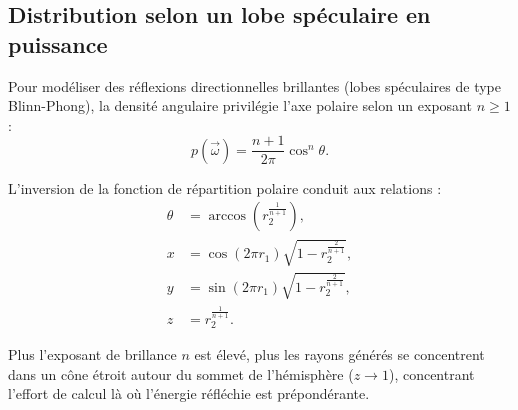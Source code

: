\subsection{Distribution selon un lobe spéculaire en puissance}

Pour modéliser des réflexions directionnelles brillantes (lobes spéculaires de type Blinn-Phong), la densité angulaire privilégie l'axe polaire selon un exposant $n \geqslant 1$ :
\begin{equation}
    p(\vec{\omega}) = \frac{n + 1}{2\pi} \cos^n\theta.
\end{equation}

\begin{proposition}
    L'inversion de la fonction de répartition polaire conduit aux relations :
    \begin{align}
        \theta &= \arccos\left( r_2^{\frac{1}{n+1}} \right), \\
        x &= \cos(2\pi r_1) \sqrt{1 - r_2^{\frac{2}{n+1}}}, \\
        y &= \sin(2\pi r_1) \sqrt{1 - r_2^{\frac{2}{n+1}}}, \\
        z &= r_2^{\frac{1}{n+1}}.
    \end{align}
\end{proposition}
Plus l'exposant de brillance $n$ est élevé, plus les rayons générés se concentrent dans un cône étroit autour du sommet de l'hémisphère ($z \to 1$), concentrant l'effort de calcul là où l'énergie réfléchie est prépondérante.